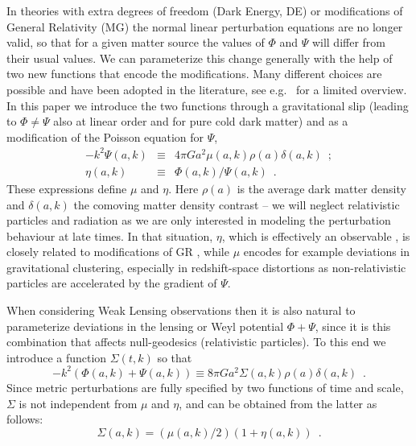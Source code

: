 In theories with extra degrees of freedom (Dark Energy, DE) or modifications
of General Relativity (MG) the normal linear perturbation equations
are no longer valid, so that for a given matter source the values
of $\Phi$ and $\Psi$ will differ from their usual values. We can
parameterize this change generally with the help of two new functions
that encode the modifications. Many different choices are possible
and have been adopted in the literature, see e.g.\
\cite{planck_collaboration_planck_2016} for a limited overview. In this paper
we introduce the two functions through a gravitational slip (leading
to $\Phi\neq\Psi$ also at linear order and for pure cold dark matter)
and as a modification of the Poisson equation for $\Psi$, 
\begin{eqnarray}
-k^{2}\Psi(a,k) & \equiv & 4\pi
Ga^{2}\mu(a,k)\rho(a)\delta(a,k)\,\,\,;\label{eq: mu_def}\\
\eta(a,k) & \equiv & \Phi(a,k)/\Psi(a,k)\,\,\,.\label{eq: eta_def}
\end{eqnarray}
These expressions define $\mu$ and $\eta$. Here $\rho(a)$ is the average dark matter density and $\delta(a,k)$
the comoving matter density contrast -- we will neglect relativistic
particles and radiation as we are only interested in modeling the
perturbation behaviour at late times. In that situation, $\eta$,
which is effectively an observable \cite{amendola_observables_2013}, is closely related to
modifications of GR \cite{saltas_anisotropic_2014,sawicki_non-standard_2016}, while $\mu$ encodes for example deviations in
gravitational clustering, especially in redshift-space distortions
as non-relativistic particles are accelerated by the gradient of $\Psi$.

When considering Weak Lensing observations then it is also natural
to parameterize deviations in the lensing or Weyl potential $\Phi+\Psi$,
since it is this combination that affects null-geodesics (relativistic particles).
To this end we introduce a function $\Sigma(t,k)$ so that
\begin{equation}
-k^{2}(\Phi(a,k)+\Psi(a,k))\equiv8\pi
Ga^{2}\Sigma(a,k)\rho(a)\delta(a,k)\,\,\,.\label{eq:Sigma-def}
\end{equation}
Since metric perturbations are fully specified by two functions of
time and scale, $\Sigma$ is not independent from $\mu$ and $\eta$,
and can be obtained from the latter as follows: 
\begin{equation}
\Sigma(a,k)=(\mu(a,k)/2)(1+\eta(a,k))\,\,\,.\label{eq:SigmaofMuEta}
\end{equation}


